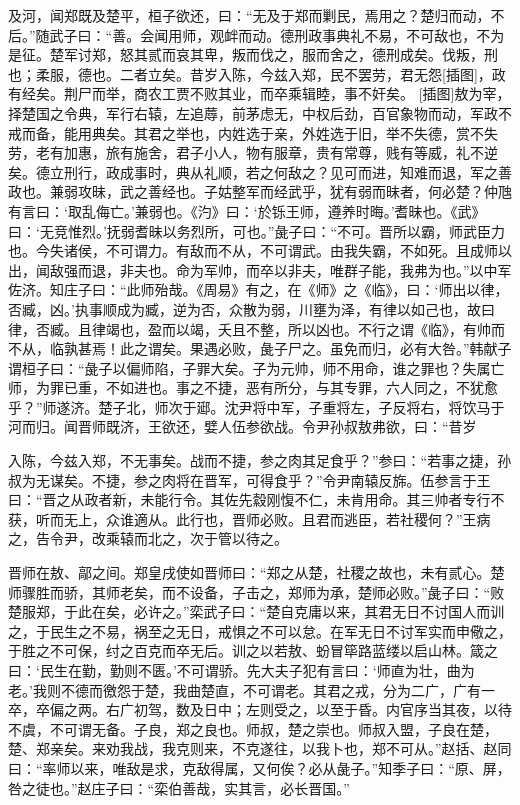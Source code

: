 \documentclass[a4paper,12pt,UTF8,twoside]{ctexbook}
\begin{document}
及河，闻郑既及楚平，桓子欲还，曰：“无及于郑而剿民，焉用之？楚归而动，不后。”随武子曰：“善。会闻用师，观衅而动。德刑政事典礼不易，不可敌也，不为是征。楚军讨郑，怒其贰而哀其卑，叛而伐之，服而舍之，德刑成矣。伐叛，刑也；柔服，德也。二者立矣。昔岁入陈，今兹入郑，民不罢劳，君无怨[插图]，政有经矣。荆尸而举，商农工贾不败其业，而卒乘辑睦，事不奸矣。 [插图]敖为宰，择楚国之令典，军行右辕，左追蓐，前茅虑无，中权后劲，百官象物而动，军政不戒而备，能用典矣。其君之举也，内姓选于亲，外姓选于旧，举不失德，赏不失劳，老有加惠，旅有施舍，君子小人，物有服章，贵有常尊，贱有等威，礼不逆矣。德立刑行，政成事时，典从礼顺，若之何敌之？见可而进，知难而退，军之善政也。兼弱攻昧，武之善经也。子姑整军而经武乎，犹有弱而昧者，何必楚？仲虺有言曰：‘取乱侮亡。’兼弱也。《汋》曰：‘於铄王师，遵养时晦。’耆昧也。《武》曰：‘无竞惟烈。’抚弱耆昧以务烈所，可也。”彘子曰：“不可。晋所以霸，师武臣力也。今失诸侯，不可谓力。有敌而不从，不可谓武。由我失霸，不如死。且成师以出，闻敌强而退，非夫也。命为军帅，而卒以非夫，唯群子能，我弗为也。”以中军佐济。知庄子曰：“此师殆哉。《周易》有之，在《师》之《临》，曰：‘师出以律，否臧，凶。’执事顺成为臧，逆为否，众散为弱，川壅为泽，有律以如己也，故曰律，否臧。且律竭也，盈而以竭，夭且不整，所以凶也。不行之谓《临》，有帅而不从，临孰甚焉！此之谓矣。果遇必败，彘子尸之。虽免而归，必有大咎。”韩献子谓桓子曰：“彘子以偏师陷，子罪大矣。子为元帅，师不用命，谁之罪也？失属亡师，为罪已重，不如进也。事之不捷，恶有所分，与其专罪，六人同之，不犹愈乎？”师遂济。楚子北，师次于郔。沈尹将中军，子重将左，子反将右，将饮马于河而归。闻晋师既济，王欲还，嬖人伍参欲战。令尹孙叔敖弗欲，曰：“昔岁

入陈，今兹入郑，不无事矣。战而不捷，参之肉其足食乎？”参曰：“若事之捷，孙叔为无谋矣。不捷，参之肉将在晋军，可得食乎？”令尹南辕反旆。伍参言于王曰：“晋之从政者新，未能行令。其佐先縠刚愎不仁，未肯用命。其三帅者专行不获，听而无上，众谁適从。此行也，晋师必败。且君而逃臣，若社稷何？”王病之，告令尹，改乘辕而北之，次于管以待之。

晋师在敖、鄗之间。郑皇戌使如晋师曰：“郑之从楚，社稷之故也，未有贰心。楚师骤胜而骄，其师老矣，而不设备，子击之，郑师为承，楚师必败。”彘子曰：“败楚服郑，于此在矣，必许之。”栾武子曰：“楚自克庸以来，其君无日不讨国人而训之，于民生之不易，祸至之无日，戒惧之不可以怠。在军无日不讨军实而申儆之，于胜之不可保，纣之百克而卒无后。训之以若敖、蚡冒筚路蓝缕以启山林。箴之曰：‘民生在勤，勤则不匮。’不可谓骄。先大夫子犯有言曰：‘师直为壮，曲为老。’我则不德而徼怨于楚，我曲楚直，不可谓老。其君之戎，分为二广，广有一卒，卒偏之两。右广初驾，数及日中；左则受之，以至于昏。内官序当其夜，以待不虞，不可谓无备。子良，郑之良也。师叔，楚之崇也。师叔入盟，子良在楚，楚、郑亲矣。来劝我战，我克则来，不克遂往，以我卜也，郑不可从。”赵括、赵同曰：“率师以来，唯敌是求，克敌得属，又何俟？必从彘子。”知季子曰：“原、屏，咎之徒也。”赵庄子曰：“栾伯善哉，实其言，必长晋国。”
\end{document}
